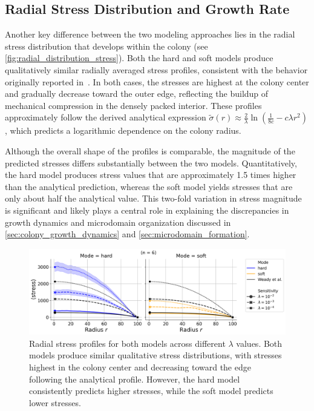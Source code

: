 \documentclass[conference]{IEEEtran}
\begin{document}
\subsection{Radial Stress Distribution and Growth Rate}

Another key difference between the two modeling approaches lies in the radial stress distribution that develops within the colony (see \autoref{fig:radial_distribution_stress}). Both the hard and soft models produce qualitatively similar radially averaged stress profiles, consistent with the behavior originally reported in~\cite{Weady2024}. In both cases, the stresses are highest at the colony center and gradually decrease toward the outer edge, reflecting the buildup of mechanical compression in the densely packed interior. These profiles approximately follow the derived analytical expression $\tilde{\sigma}(r) \approx \frac{2}{\lambda} \ln\left(\frac{1}{8 c} - c\lambda r^2 \right)$, which predicts a logarithmic dependence on the colony radius.

Although the overall shape of the profiles is comparable, the magnitude of the predicted stresses differs substantially between the two models. Quantitatively, the hard model produces stress values that are approximately 1.5 times higher than the analytical prediction, whereas the soft model yields stresses that are only about half the analytical value. This two-fold variation in stress magnitude is significant and likely plays a central role in explaining the discrepancies in growth dynamics and microdomain organization discussed in \autoref{sec:colony_growth_dynamics} and \autoref{sec:microdomain_formation}.

\begin{figure}[b]
    \centering
    \includegraphics[width=\linewidth]{figures/comparison_plots/combined_stress_shared.png}
    \caption{Radial stress profiles for both models across different $\lambda$ values. Both models produce similar qualitative stress distributions, with stresses highest in the colony center and decreasing toward the edge following the analytical profile. However, the hard model consistently predicts higher stresses, while the soft model predicts lower stresses.}
    \label{fig:radial_distribution_stress}
\end{figure}
\end{document}
